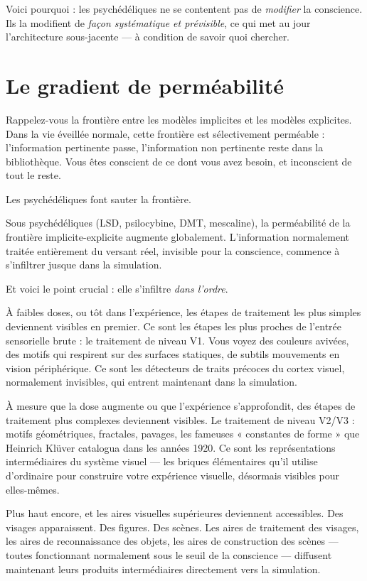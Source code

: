 \documentclass[11pt, twoside, openright]{book}
\begin{document}
Voici pourquoi : les psychédéliques ne se contentent pas de \textit{modifier} la conscience. Ils la modifient de \textit{façon systématique et prévisible}, ce qui met au jour l'architecture sous-jacente --- à condition de savoir quoi chercher.

\section*{Le gradient de perméabilité}

Rappelez-vous la frontière entre les modèles implicites et les modèles explicites. Dans la vie éveillée normale, cette frontière est sélectivement perméable : l'information pertinente passe, l'information non pertinente reste dans la bibliothèque. Vous êtes conscient de ce dont vous avez besoin, et inconscient de tout le reste.

Les psychédéliques font sauter la frontière.

Sous psychédéliques (LSD, psilocybine, DMT, mescaline), la perméabilité de la frontière implicite-explicite augmente globalement. L'information normalement traitée entièrement du versant réel, invisible pour la conscience, commence à s'infiltrer jusque dans la simulation.

Et voici le point crucial : elle s'infiltre \textit{dans l'ordre}.

À faibles doses, ou tôt dans l'expérience, les étapes de traitement les plus simples deviennent visibles en premier. Ce sont les étapes les plus proches de l'entrée sensorielle brute : le traitement de niveau V1. Vous voyez des couleurs avivées, des motifs qui respirent sur des surfaces statiques, de subtils mouvements en vision périphérique. Ce sont les détecteurs de traits précoces du cortex visuel, normalement invisibles, qui entrent maintenant dans la simulation.

À mesure que la dose augmente ou que l'expérience s'approfondit, des étapes de traitement plus complexes deviennent visibles. Le traitement de niveau V2/\allowbreak{}V3 : motifs géométriques, fractales, pavages, les fameuses « constantes de forme » que Heinrich Klüver catalogua dans les années 1920. Ce sont les représentations intermédiaires du système visuel --- les briques élémentaires qu'il utilise d'ordinaire pour construire votre expérience visuelle, désormais visibles pour elles-mêmes.

Plus haut encore, et les aires visuelles supérieures deviennent accessibles. Des visages apparaissent. Des figures. Des scènes. Les aires de traitement des visages, les aires de reconnaissance des objets, les aires de construction des scènes --- toutes fonctionnant normalement sous le seuil de la conscience --- diffusent maintenant leurs produits intermédiaires directement vers la simulation.
\end{document}

